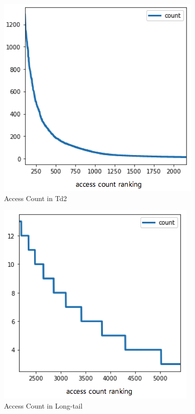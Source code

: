 \documentclass[sigconf,anonymous=true]{acmart}
\begin{document}
\begin{figure}[H]
    \centering
    \includegraphics[width=0.85\columnwidth]{figs/figure_03_td2.png}
    \caption{Access Count in Td2}
    \label{fig:fig4}
\end{figure}

\begin{figure}[H]
    \centering
    \includegraphics[width=0.85\columnwidth]{figs/figure_04_td3.png}
    \caption{Access Count in Long-tail}
    \label{fig:fig5}
\end{figure}
\end{document}
